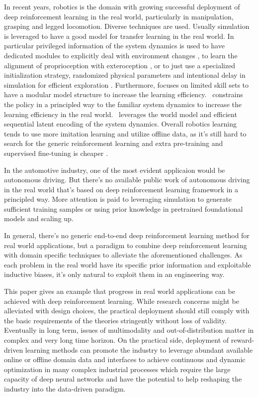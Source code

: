 \documentclass[conference]{IEEEtran}
\begin{document}
In recent years, robotics is the domain with growing successful deployment of deep reinforcement learning in the real world, particularly in manipulation, grasping and legged locomotion. Diverse techniques are used. Usually simulation is leveraged to have a good model for transfer learning in the real world. In particular privileged information of the system dynamics is used to have dedicated modules to explicitly deal with environment changes \parencite{kumar21:_rma}, to learn the alignment of proprioception with exteroception \parencite{Miki_2022}, or to just use a specialized initialization strategy, randomized physical parameters and intentional delay in simulation for efficient exploration \parencite{Song_2023}. Furthermore, \parencite{Hoeller_2024} focuses on limited skill sets to have a modular model structure to increase the learning efficiency.\ \parencite{smith23:_grow_your_limit} constrains the policy in a principled way to the familiar system dynamics to increase the learning efficiency in the real world.\ \parencite{wu22:_daydr} leverages the world model and efficient sequential latent encoding of the system dynamics. Overall robotics learning tends to use more imitation learning and utilize offline data, as it's still hard to search for the generic reinforcement learning and extra pre-training and supervised fine-tuning is cheaper \parencite{Irpan_2024}.

In the automotive industry, one of the most evident applicaion would be autonomous driving. But there's no available public work of autonomous driving in the real world that's based on deep reinforcement learning framework in a principled way. More attention is paid to leveraging simulation to generate sufficient training samples or using prior knowledge in pretrained foundational models and scaling up.

In general, there's no generic end-to-end deep reinforcement learning method for real world applications, but a paradigm to combine deep reinforcement learning with domain specific techniques to alleviate the aforementioned challenges. As each problem in the real world have its specific prior information and exploitable inductive biases, it's only natural to exploit them in an engineering way.

This paper gives an example that progress in real world applications can be achieved with deep reinforcement learning. While research concerns might be alleviated with design choices, the practical deployment should still comply with the basic requirements of the theories stringently without loss of validity. Eventually in long term, issues of multimodality and out-of-distribution matter in complex and very long time horizon. On the practical side, deployment of reward-driven learning methods can promote the industry to leverage abundant available online or offline domain data and interfaces to achieve continuous and dynamic optimization in many complex industrial processes which require the large capacity of deep neural networks and have the potential to help reshaping the industry into the data-driven paradigm.
\end{document}
